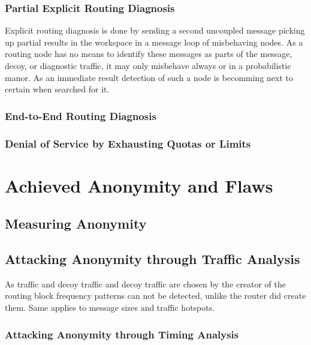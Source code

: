 \subsubsection{Partial Explicit Routing Diagnosis}
Explicit routing diagnosis is done by sending a second uncoupled message picking up partial results in the workspace in a message loop of misbehaving nodes. As a routing node has no means to identify these messages as parts of the message, decoy, or diagnostic traffic, it may only misbehave always or in a probabilistic manor. As an immediate result detection of such a node is becomming next to certain when searched for it.

\subsubsection{End-to-End Routing Diagnosis}

\subsubsection{Denial of Service by Exhausting Quotas or Limits}

\section{Achieved Anonymity and Flaws}
\subsection{Measuring Anonymity}

\subsection{Attacking Anonymity through Traffic Analysis}
As traffic and decoy traffic and decoy traffic are chosen by the creator of the routing block frequency patterns can not be detected, unlike the router did create them. Same applies to message sizes and traffic hotspots. 

\subsubsection{Attacking Anonymity through Timing Analysis}

